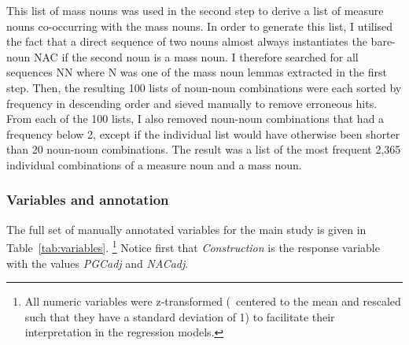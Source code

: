 This list of mass nouns was used in the second step to derive a list of measure nouns co-occurring with the mass nouns. 
In order to generate this list, I utilised the fact that a direct sequence of two nouns almost always instantiates the bare-noun NAC if the second noun is a mass noun.
I therefore searched for all sequences NN where N was one of the mass noun lemmas extracted in the first step.
Then, the resulting 100 lists of noun-noun combinations were each sorted by frequency in descending order and sieved manually to remove erroneous hits.
From each of the 100 lists, I also removed noun-noun combinations that had a frequency below 2, except if the individual list would have otherwise been shorter than 20 noun-noun combinations.
The result was a list of the most frequent 2,365 individual combinations of a measure noun and a mass noun.


\subsubsection{Variables and annotation}
\label{sec:variablesandannotation}

The full set of manually annotated variables for the main study is given in Table~\ref{tab:variables}.%
\footnote{All numeric variables were z-transformed (\ie\ centered to the mean and rescaled such that they have a standard deviation of 1) to facilitate their interpretation in the regression models.}
Notice first that \textit{Construction} is the response variable with the values \textit{PGCadj} and \textit{NACadj}.

